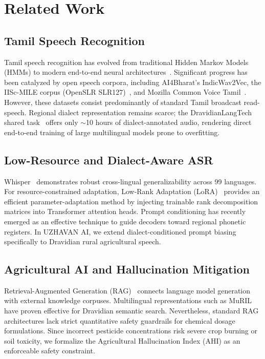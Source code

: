 \documentclass[conference]{IEEEtran}
\begin{document}
\section{Related Work}

\subsection{Tamil Speech Recognition}
Tamil speech recognition has evolved from traditional Hidden Markov Models (HMMs) to modern end-to-end neural architectures~\cite{prakash2022endtoend}. Significant progress has been catalyzed by open speech corpora, including AI4Bharat's IndicWav2Vec, the IISc-MILE corpus (OpenSLR SLR127)~\cite{openSLR127}, and Mozilla Common Voice Tamil~\cite{commonvoice}. However, these datasets consist predominantly of standard Tamil broadcast read-speech. Regional dialect representation remains scarce; the DravidianLangTech shared task~\cite{chakravarthi2022dravidian} offers only $\sim$10 hours of dialect-annotated audio, rendering direct end-to-end training of large multilingual models prone to overfitting.

\subsection{Low-Resource and Dialect-Aware ASR}
Whisper~\cite{radford2023whisper} demonstrates robust cross-lingual generalizability across 99 languages. For resource-constrained adaptation, Low-Rank Adaptation (LoRA)~\cite{hu2022lora} provides an efficient parameter-adaptation method by injecting trainable rank decomposition matrices into Transformer attention heads. Prompt conditioning has recently emerged as an effective technique to guide decoders toward regional phonetic registers. In UZHAVAN AI, we extend dialect-conditioned prompt biasing specifically to Dravidian rural agricultural speech.

\subsection{Agricultural AI and Hallucination Mitigation}
Retrieval-Augmented Generation (RAG)~\cite{lewis2020retrieval} connects language model generation with external knowledge corpuses. Multilingual representations such as MuRIL~\cite{khanuja2021muril} have proven effective for Dravidian semantic search. Nevertheless, standard RAG architectures lack strict quantitative safety guardrails for chemical dosage formulations. Since incorrect pesticide concentrations risk severe crop burning or soil toxicity, we formalize the Agricultural Hallucination Index (AHI) as an enforceable safety constraint.
\end{document}
